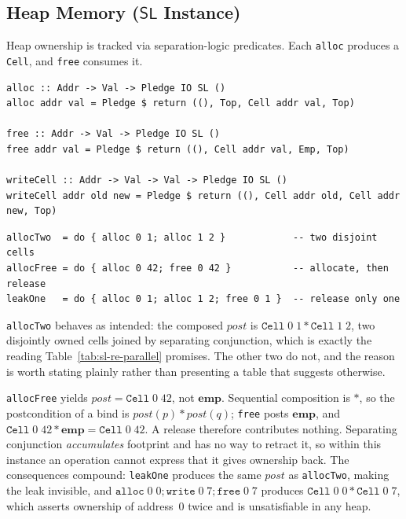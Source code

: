 \documentclass[acmsmall,screen]{acmart}
\newcommand{\SL}{\mathsf{SL}}
\newcommand{\sep}{*}
\newcommand{\post}{\mathit{post}}
\begin{document}
\subsection{Heap Memory (\texorpdfstring{$\SL$}{SL} Instance)}
\label{sec:ex-heap}

Heap ownership is tracked via separation-logic predicates.
Each \lstinline{alloc} produces a \lstinline{Cell}, and \lstinline{free}
consumes it.

\begin{lstlisting}
alloc :: Addr -> Val -> Pledge IO SL ()
alloc addr val = Pledge $ return ((), Top, Cell addr val, Top)

free :: Addr -> Val -> Pledge IO SL ()
free addr val = Pledge $ return ((), Cell addr val, Emp, Top)

writeCell :: Addr -> Val -> Val -> Pledge IO SL ()
writeCell addr old new = Pledge $ return ((), Cell addr old, Cell addr new, Top)
\end{lstlisting}

\begin{lstlisting}
allocTwo  = do { alloc 0 1; alloc 1 2 }            -- two disjoint cells
allocFree = do { alloc 0 42; free 0 42 }           -- allocate, then release
leakOne   = do { alloc 0 1; alloc 1 2; free 0 1 }  -- release only one
\end{lstlisting}

\noindent
\lstinline{allocTwo} behaves as intended: the composed $\post$ is
$\mathtt{Cell}\;0\;1 \sep \mathtt{Cell}\;1\;2$, two disjointly owned cells
joined by separating conjunction, which is exactly the reading
Table~\ref{tab:sl-re-parallel} promises.
The other two do not, and the reason is worth stating plainly rather than
presenting a table that suggests otherwise.

\lstinline{allocFree} yields $\post = \mathtt{Cell}\;0\;42$, not
$\mathbf{emp}$.
Sequential composition is $\sep$, so the postcondition of a bind is
$\post(p) \sep \post(q)$; \lstinline{free} posts $\mathbf{emp}$, and
$\mathtt{Cell}\;0\;42 \sep \mathbf{emp} = \mathtt{Cell}\;0\;42$.
A release therefore contributes nothing.
Separating conjunction \emph{accumulates} footprint and has no way to
retract it, so within this instance an operation cannot express that it
gives ownership back.
The consequences compound: \lstinline{leakOne} produces the same $\post$ as
\lstinline{allocTwo}, making the leak invisible, and
$\mathtt{alloc}\;0\;0 \mathbin{;} \mathtt{write}\;0\;7 \mathbin{;}
\mathtt{free}\;0\;7$ produces
$\mathtt{Cell}\;0\;0 \sep \mathtt{Cell}\;0\;7$, which asserts ownership of
address~$0$ twice and is unsatisfiable in any heap.
\end{document}
